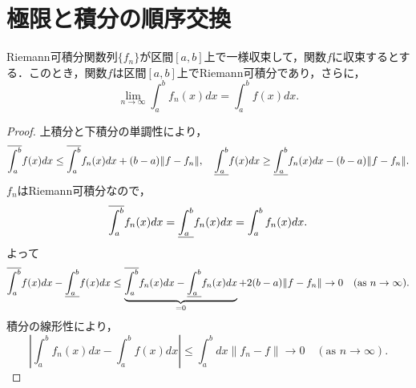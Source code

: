 \section{極限と積分の順序交換}
\begin{theorem}
    Riemann可積分関数列$\{f_n\}$が区間$[a,b]$上で一様収束して，関数$f$に収束するとする．このとき，関数$f$は区間$[a,b]$上でRiemann可積分であり，さらに，
    \[
    \lim_{n \to \infty} \int_a^b f_n(x) dx = \int_a^b f(x) dx.
    \]
\end{theorem}

\begin{proof}
    上積分と下積分の単調性により，
    \[
    \overline{\int_{a}^{b}} f(x) dx \le \overline{\int_{a}^{b}} f_n(x) dx + (b-a)\| f - f_n \|,
    \quad \underline{\int_{a}^{b}} f(x) dx \ge \underline{\int_{a}^{b}} f_n(x) dx - (b-a)\| f - f_n \|.
    \]
    $f_n$はRiemann可積分なので，%
    \[
    \overline{\int_{a}^{b}} f_n(x) dx = \underline{\int_{a}^{b}} f_n(x) dx = \int_a^b f_n(x) dx.
    \]
    よって
    \[
    \overline{\int_{a}^{b}} f(x) dx - \underline{\int_{a}^{b}} f(x) dx \le \underbrace{\overline{\int_{a}^{b}} f_n(x) dx - \underline{\int_{a}^{b}} f_n(x) dx}_{=0} + 2(b-a)\| f - f_n \| \to 0 \quad (\text{as } n \to \infty).
    \]
    積分の線形性により，
    \[
    | \int_a^b f_n(x)dx - \int_a^b f(x)dx | \le \int_a^b dx \|f_n - f\| \to 0 \quad (\text{as } n \to \infty).
    \]
\end{proof}
